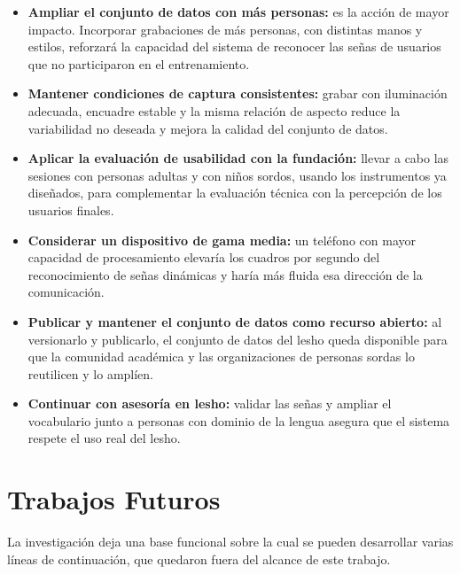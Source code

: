 \begin{itemize}
    \item \textbf{Ampliar el conjunto de datos con más personas:} es la acción de mayor impacto. Incorporar grabaciones de más personas, con distintas manos y estilos, reforzará la capacidad del sistema de reconocer las señas de usuarios que no participaron en el entrenamiento.
    \item \textbf{Mantener condiciones de captura consistentes:} grabar con iluminación adecuada, encuadre estable y la misma relación de aspecto reduce la variabilidad no deseada y mejora la calidad del conjunto de datos.
    \item \textbf{Aplicar la evaluación de usabilidad con la fundación:} llevar a cabo las sesiones con personas adultas y con niños sordos, usando los instrumentos ya diseñados, para complementar la evaluación técnica con la percepción de los usuarios finales.
    \item \textbf{Considerar un dispositivo de gama media:} un teléfono con mayor capacidad de procesamiento elevaría los cuadros por segundo del reconocimiento de señas dinámicas y haría más fluida esa dirección de la comunicación.
    \item \textbf{Publicar y mantener el conjunto de datos como recurso abierto:} al versionarlo y publicarlo, el conjunto de datos del \Acrshort{lesho} queda disponible para que la comunidad académica y las organizaciones de personas sordas lo reutilicen y lo amplíen.
    \item \textbf{Continuar con asesoría en \Acrshort{lesho}:} validar las señas y ampliar el vocabulario junto a personas con dominio de la lengua asegura que el sistema respete el uso real del \Acrshort{lesho}.
\end{itemize}

\section{Trabajos Futuros}

La investigación deja una base funcional sobre la cual se pueden desarrollar varias líneas de continuación, que quedaron fuera del alcance de este trabajo.

